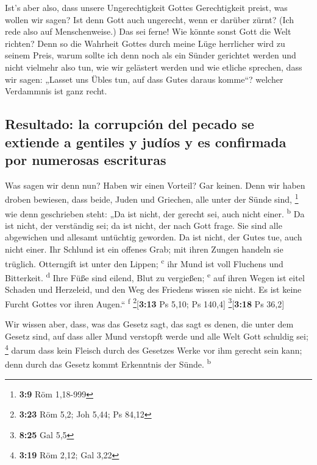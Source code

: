  Ist's aber also, dass unsere Ungerechtigkeit Gottes
Gerechtigkeit preist, was wollen wir sagen? Ist denn Gott auch
ungerecht, wenn er darüber zürnt? (Ich rede also auf Menschenweise.)
 Das sei ferne! Wie könnte sonst Gott die Welt richten?
 Denn so die Wahrheit Gottes durch meine Lüge herrlicher
wird zu seinem Preis, warum sollte ich denn noch als ein Sünder
gerichtet werden  und nicht vielmehr also tun, wie wir
gelästert werden und wie etliche sprechen, dass wir sagen: „Lasset uns
Übles tun, auf dass Gutes daraus komme``? welcher Verdammnis ist ganz
recht.

\hypertarget{resultado-la-corrupciuxf3n-del-pecado-se-extiende-a-gentiles-y-juduxedos-y-es-confirmada-por-numerosas-escrituras}{%
\subsection{Resultado: la corrupción del pecado se extiende a gentiles y
judíos y es confirmada por numerosas
escrituras}\label{resultado-la-corrupciuxf3n-del-pecado-se-extiende-a-gentiles-y-juduxedos-y-es-confirmada-por-numerosas-escrituras}}

 Was sagen wir denn nun? Haben wir einen Vorteil? Gar
keinen. Denn wir haben droben bewiesen, dass beide, Juden und Griechen,
alle unter der Sünde sind, \footnote{\textbf{3:9} Röm 1,18-999}
 wie denn geschrieben steht: „Da ist nicht, der gerecht
sei, auch nicht einer. \textsuperscript{b}  Da ist nicht,
der verständig sei; da ist nicht, der nach Gott frage. 
Sie sind alle abgewichen und allesamt untüchtig geworden. Da ist nicht,
der Gutes tue, auch nicht einer.  Ihr Schlund ist ein
offenes Grab; mit ihren Zungen handeln sie trüglich. Otterngift ist
unter den Lippen; \textsuperscript{c}  ihr Mund ist voll
Fluchens und Bitterkeit. \textsuperscript{d}  Ihre Füße
sind eilend, Blut zu vergießen; \textsuperscript{e}  auf
ihren Wegen ist eitel Schaden und Herzeleid,  und den Weg
des Friedens wissen sie nicht.  Es ist keine Furcht
Gottes vor ihren Augen.`` \textsuperscript{f}
\footnote{\textbf{3:23} Röm 5,2; Joh 5,44; Ps 84,12}{[}\textbf{3:13} Ps
5,10; Ps 140,4{]} \footnote{\textbf{8:25} Gal 5,5}{[}\textbf{3:18} Ps
36,2{]}

 Wir wissen aber, dass, was das Gesetz sagt, das sagt es
denen, die unter dem Gesetz sind, auf dass aller Mund verstopft werde
und alle Welt Gott schuldig sei; \footnote{\textbf{3:19} Röm 2,12; Gal
  3,22}  darum dass kein Fleisch durch des Gesetzes Werke
vor ihm gerecht sein kann; denn durch das Gesetz kommt Erkenntnis der
Sünde. \textsuperscript{b}

